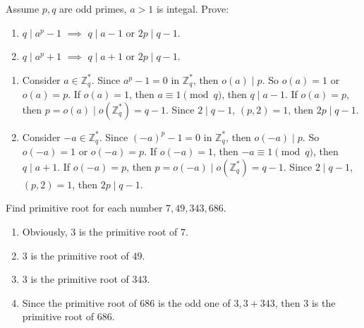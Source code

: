 \documentclass{ctexart}
\newif\ifpreface
\begin{document}
\large
\setlength{\baselineskip}{1.2em}
\ifpreface
  
  \newgeometry{left=2cm,right=2cm,top=2cm,bottom=2cm}
\else
  \maketitle \fi
\begin{problem}\label{pro:1}
  Assume \(p,q\) are odd primes, \(a > 1\) is integal.
  Prove:
  \begin{enumerate}
    \item \(q \mid a^p-1\) \(\implies\) \(q \mid a-1\) or \(2p \mid q- 1\).
    \item \(q \mid a^p + 1\) \(\implies\) \(q \mid a +1\) or \(2p \mid q- 1\).
  \end{enumerate}
\end{problem}
\begin{solution}
  \begin{enumerate}
    \item Consider \(a \in \mathbb{Z}_q^{*}\). Since \(a^{p}-1 =0 \) in \(\mathbb{Z}_q^{*}\), then \(o(a) \mid p\).
      So \(o(a)=1\) or \(o(a)=p\).
      If \(o(a)=1\), then \(a \equiv 1 \pmod{q}\), then \(q \mid a-1\).
      If \(o(a)=p\), then \(p=o(a) \mid o(\mathbb{Z}_q^{*})=q-1\).
      Since \(2 \mid q-1\), \((p,2)=1\), then \(2p \mid q-1\).
    \item Consider \(-a \in \mathbb{Z}_q^{*}\). Since \((-a)^p-1 =0 \) in \(\mathbb{Z}_q^{*}\), then \(o(-a) \mid p\).
      So \(o(-a)=1\) or \(o(-a)=p\).
      If \(o(-a)=1\), then \(-a \equiv 1 \pmod{q}\), then \(q \mid a +1\).
      If \(o(-a)=p\), then \(p=o(-a) \mid o(\mathbb{Z}_q^{*})=q-1\).
      Since \(2 \mid q-1\), \((p,2)=1\), then \(2p \mid q-1\).
  \end{enumerate}
\end{solution}

\begin{problem}\label{pro:2}
  Find primitive root for each number \(7,49,343,686\).
\end{problem}
\begin{solution}
  \begin{enumerate}
    \item Obviously, \(3\) is the primitive root of \(7\).
    \item \(3\) is the primitive root of \(49\).
    \item \(3\) is the primitive root of \(343\).
    \item Since the primitive root of \(686\) is the odd one of \(3, 3 + 343\), then \(3\) is
      the primitive root of \(686\).
  \end{enumerate}

\end{solution}
\end{document}

